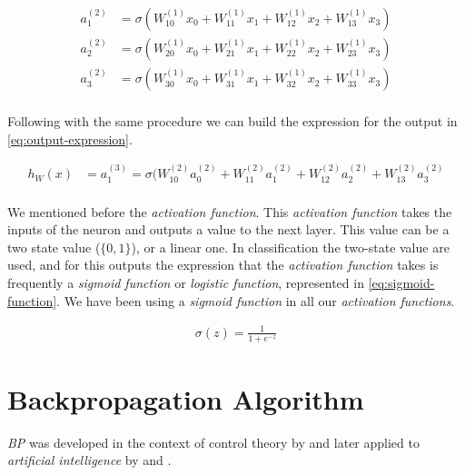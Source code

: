 \begin{equation}
  \begin{aligned}
    \label{eq:layer-2-expression}
    a_1^{(2)} & = \sigma(W_{10}^{(1)} x_0 + W_{11}^{(1)} x_1
    + W_{12}^{(1)} x_2 + W_{13}^{(1)} x_3) \\
    a_2^{(2)} & = \sigma(W_{20}^{(1)} x_0 + W_{21}^{(1)} x_1
    + W_{22}^{(1)} x_2 + W_{23}^{(1)} x_3) \\
    a_3^{(2)} & = \sigma(W_{30}^{(1)} x_0 + W_{31}^{(1)} x_1
    + W_{32}^{(1)} x_2 + W_{33}^{(1)} x_3) \\
  \end{aligned}
\end{equation}

Following with the same procedure we can build the expression for the
output in \autoref{eq:output-expression}.

\begin{equation}
  \begin{aligned}
    \label{eq:output-expression}
    h_{W}(x) & = a_1^{(3)} = \sigma(W_{10}^{(2)} a_0^{(2)}
    + W_{11}^{(2)} a_1^{(2)} + W_{12}^{(2)} a_2^{(2)}
    + W_{13}^{(2)} a_3^{(2)} \\
  \end{aligned}
\end{equation}

We mentioned before the \textit{activation function}. This
\textit{activation function} takes the inputs of the neuron and
outputs a value to the next layer. This value can be a two state value
($\{0,1\}$), or a linear one. In classification the two-state value
are used, and for this outputs the expression that the
\textit{activation function} takes is frequently a \textit{sigmoid
function} or \textit{logistic function}, represented in
\autoref{eq:sigmoid-function}. We have been using a \textit{sigmoid
function} in all our \textit{activation functions}.

\begin{equation}
  \begin{aligned}
    \label{eq:sigmoid-function}
    \sigma(z) = \frac{1}{1 + e^{-z}}
  \end{aligned}
\end{equation}

\section{Backpropagation Algorithm}

\textit{BP} was developed in the context of control theory by
\cite{kelley1960gradient} and later applied to \textit{artificial
intelligence} by \cite{werbos1974beyond} and
\cite{rumelhart1988learning}.


